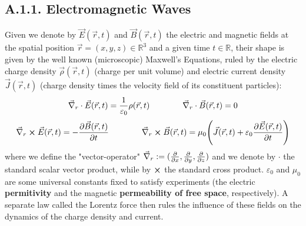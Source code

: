 \documentclass[11pt, a4paper, twoside]{article} %
\newcommand{\R}{\mathbb{R}} %
\begin{document}
\subsection*{A.1.1. Electromagnetic Waves \vspace{-0.2cm}}
Given we denote by $\vec{E}(\vec{r},t)$ and $\vec{B}(\vec{r},t)$ the electric and magnetic fields at the spatial position $\vec{r}=(x,y,z)\in\R^3$ and a given time $t\in\R$, their shape is given by the well known (microscopic) Maxwell's Equations, ruled by the electric charge density $\vec{\rho}(\vec{r},t)$ (charge per unit volume) and electric current density $\vec{J}(\vec{r},t)$ (charge density times the velocity field of its constituent particles):\vspace{-0.2cm}
\begin{equation}\label{div}
\vec{\nabla}_r\cdot \vec{E}(\vec{r},t)=\frac{1}{\varepsilon_0}\rho(\vec{r},t) \quad  \quad \quad \quad \vec{\nabla}_r\cdot \vec{B}(\vec{r},t)=0 \vspace{-0.2cm}
\end{equation}
\begin{equation}\label{curl}
\vec{\nabla }_r\cross \vec{E}(\vec{r},t)=-\pdv{\vec{B}(\vec{r},t)}{t}  \quad  \quad \quad \quad \vec{\nabla }_r\cross \vec{B}(\vec{r},t)=\mu_0\qty(\vec{J}(\vec{r},t)+\varepsilon_0\pdv{\vec{E}(\vec{r},t)}{t})\vspace{-0.2cm}
\end{equation}
where we define the "vector-operator" $\vec{\nabla}_r:=(\pdv{}{x}, \pdv{}{y},\pdv{}{z})$ and we denote by $\cdot$ the standard scalar vector product, while by $\cross $ the standard cross product. $\varepsilon_0$ and $\mu_0$ are some universal constants fixed to satisfy experiments (the electric {\bf permitivity} and the magnetic {\bf permeability of free space}, respectively). A separate law called the Lorentz force then rules the influence of these fields on the dynamics of the charge density and current.
\end{document}
